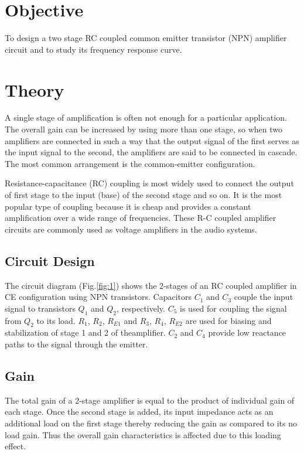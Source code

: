\section{Objective}
To design a two stage RC coupled common emitter transistor (NPN) amplifier circuit
and to study its frequency response curve.

\section{Theory}
A single stage of amplification is often not enough for a particular application. The
overall gain can be increased by using more than one stage, so when two amplifiers are
connected in such a way that the output signal of the first serves as the input signal to the
second, the amplifiers are said to be connected in cascade. The most common
arrangement is the common-emitter configuration.

Resistance-capacitance (RC) coupling is most widely used to connect the output of first stage
to the input (base) of the second stage and so on. It is the most popular type of coupling
because it is cheap and provides a constant amplification over a wide range of frequencies.
These R-C coupled amplifier circuits are commonly used as voltage amplifiers in the
audio systems.

\subsection*{Circuit Design}

The circuit diagram (Fig.\ref{fig:1}) shows the 2-stages of an RC coupled amplifier in CE
configuration using NPN transistors. Capacitors $C_1$ and $C_3$ couple the input signal to
transistors $Q_1$ and $Q_2$, respectively. $C_5$ is used for coupling the signal from $Q_2$ to its load.
$R_1$, $R_2$, $R_{E1}$ and $R_3$, $R_4$, $R_{E2}$ are used for biasing and stabilization of stage 1 and 2 of theamplifier. $C_2$ and $C_4$ provide low reactance paths to the signal through the emitter.

\subsection*{Gain}
The total gain of a 2-stage amplifier is equal to the product of individual gain of each
stage. Once the second stage is added, its input impedance acts as an additional load on the first stage thereby reducing the gain as compared to its no load
gain. Thus the overall gain characteristics is affected due to this loading effect.

